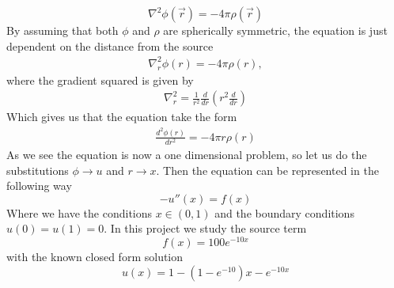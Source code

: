 \documentclass[12pt]{article}
\numberwithin{equation}{section}     %
\begin{document}
\begin{equation}\label{Poisson}
     \nabla^{2}\phi(\vec{r})=-4\pi\rho(\vec{r})
\end{equation}
By assuming that both $\phi$ and $\rho$ are spherically symmetric, the equation is just dependent on the distance from the source
\begin{align}
    \nabla_{r}^{2}\phi(r)=-4\pi\rho(r),
\end{align}
where the gradient squared is given by
\begin{align}
    \nabla_{r}^{2}=\frac{1}{r^{2}}\frac{d}{dr}\left(r^{2}\frac{d}{dr} \right)
\end{align}
Which gives us that the equation take the form
\begin{align}
    \frac{d^{2}\phi(r)}{dr^{2}}=-4\pi r\rho(r)
\end{align}
As we see the equation is now a one dimensional problem, so let us do the substitutions $\phi\rightarrow u$ and $r\rightarrow x$. Then the equation can be represented in the following way
\begin{equation}\label{u''}
    -u''(x)=f(x)
\end{equation}
Where we have the conditions $x\in(0,1)$ and the boundary conditions $u(0)=u(1)=0$. In this project we study the source term
\begin{equation}\label{source}
    f(x) = 100e^{-10x}
\end{equation}
with the known closed form solution
\begin{equation}\label{solution}
    u(x) = 1 - (1 - e^{-10})x - e^{-10x}
\end{equation}
\end{document}
